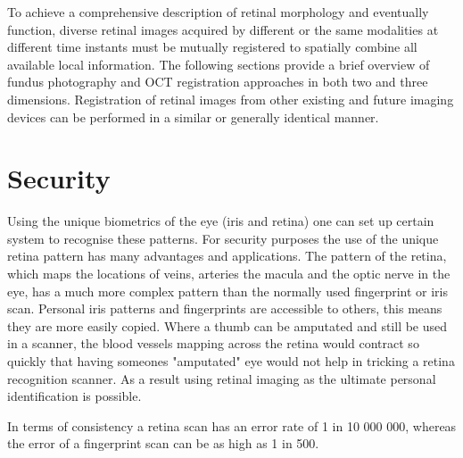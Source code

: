 To achieve a comprehensive description of retinal morphology
and eventually function, diverse retinal images acquired by different
or the same modalities at different time instants must be mutually
registered to spatially combine all available local information.
The following sections provide a brief overview of fundus photography
and OCT registration approaches in both two and three dimensions.
Registration of retinal images from other existing and future imaging
devices can be performed in a similar or generally identical manner.

\section{Security}

Using the unique biometrics of the eye (iris and retina) one can set up
certain system to recognise these patterns. For security purposes the use
of the unique retina pattern has many advantages and applications. The
pattern of the retina, which maps the locations of veins, arteries the
macula and the optic nerve in the eye, has a much more complex pattern
than the normally used fingerprint or iris scan.\cite{} Personal
iris patterns and fingerprints are accessible to others, this means
they are more easily copied. Where a thumb can be amputated and still
be used in a scanner, the blood vessels mapping across the retina would
contract so quickly that having someones "amputated" eye would not help
in tricking a retina recognition scanner. As a result using retinal
imaging as the ultimate personal identification is possible.

In terms of consistency a retina scan has an error rate of 1 in 10 000 000,
whereas the error of a fingerprint scan can be as high as 1 in 500.\cite{}
